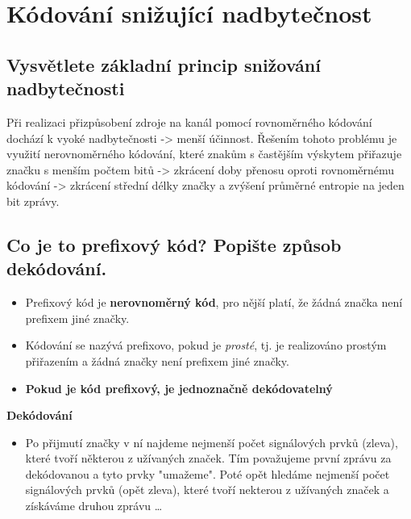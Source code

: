 \clearpage
\section{Kódování snižující nadbytečnost}
\subsection{ Vysvětlete základní princip snižování nadbytečnosti}
Při realizaci přizpůsobení zdroje na kanál pomocí rovnoměrného kódování dochází k vyoké nadbytečnosti -> menší účinnost.
Řešením tohoto problému je využití nerovnoměrného kódování, které znakům s častějším výskytem přiřazuje značku s menším počtem bitů -> zkrácení doby přenosu oproti rovnoměrnému kódování -> zkrácení střední délky značky a zvýšení průměrné entropie na jeden bit zprávy.

\subsection{Co je to prefixový kód? Popište způsob dekódování.}
\begin{itemize}
    \item Prefixový kód je \textbf{nerovnoměrný kód}, pro nější platí, že žádná značka není prefixem jiné značky.
    \item Kódování se nazývá prefixovo, pokud je \textit{prosté}, tj. je realizováno prostým přiřazením a žádná značky není prefixem jiné značky.
    \item \textbf{Pokud je kód prefixový, je jednoznačně dekódovatelný}

\end{itemize}
\textbf{Dekódování}
\begin{itemize}
    \item Po přijmutí značky v ní najdeme nejmenší počet signálových prvků (zleva), které tvoří některou z užívaných značek.
    Tím považujeme první zprávu za dekódovanou a tyto prvky "umažeme".
    Poté opět hledáme nejmenší počet signálových prvků (opět zleva), které tvoří nekterou z užívaných značek a získáváme druhou zprávu \dots
\end{itemize}

